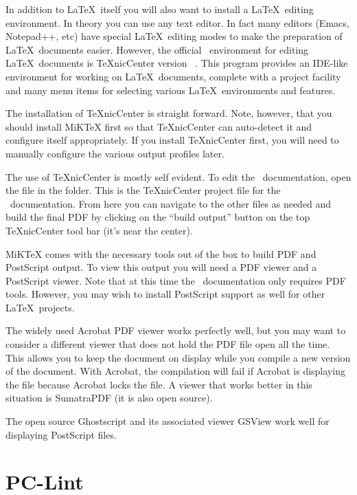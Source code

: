 In addition to \LaTeX\ itself you will also want to install a \LaTeX\ editing environment. In theory you can use any text editor. In fact many editors (Emacs, Notepad++, etc) have special \LaTeX\ editing modes to make the preparation of \LaTeX\ documents easier. However, the official \VTank\ environment for editing \LaTeX\ documents is TeXnicCenter version \TeXnicCenterVersion\ \cite{texniccenter}. This program provides an IDE-like environment for working on \LaTeX\ documents, complete with a project facility and many menu items for selecting various \LaTeX\ environments and features.

The installation of TeXnicCenter is straight forward. Note, however, that you should install MiKTeX first so that TeXnicCenter can auto-detect it and configure itself appropriately. If you install TeXnicCenter first, you will need to manually configure the various output profiles later.

The use of TeXnicCenter is mostly self evident. To edit the \VTank\ documentation, open the file  in the  folder. This is the TeXnicCenter project file for the \VTank\ documentation. From here you can navigate to the other files as needed and build the final PDF by clicking on the ``build output'' button on the top TeXnicCenter tool bar (it's near the center).

MiKTeX comes with the necessary tools out of the box to build PDF and PostScript output. To view this output you will need a PDF viewer and a PostScript viewer. Note that at this time the \VTank\ documentation only requires PDF tools. However, you may wish to install PostScript support as well for other \LaTeX\ projects.

The widely used Acrobat PDF viewer works perfectly well, but you may want to consider a different viewer that does not hold the PDF file open all the time. This allows you to keep the document on display while you compile a new version of the document. With Acrobat, the compilation will fail if Acrobat is displaying the file because Acrobat locks the file. A viewer that works better in this situation is SumatraPDF (it is also open source).

The open source Ghostscript and its associated viewer GSView work well for displaying PostScript files.

 
\section{PC-Lint}

